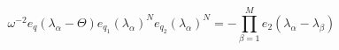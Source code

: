 \begin{equation}
\omega^{-2}e_{q}(\lambda_{\alpha}-\Theta)e_{q_{1}}(\lambda_{\alpha})^{N}
e_{q_{2}}(\lambda_{\alpha})^{N}=
-\prod_{\beta=1}^{M} e_2(\lambda_{\alpha}-\lambda_{\beta})
\label{BAER}
\end{equation}

